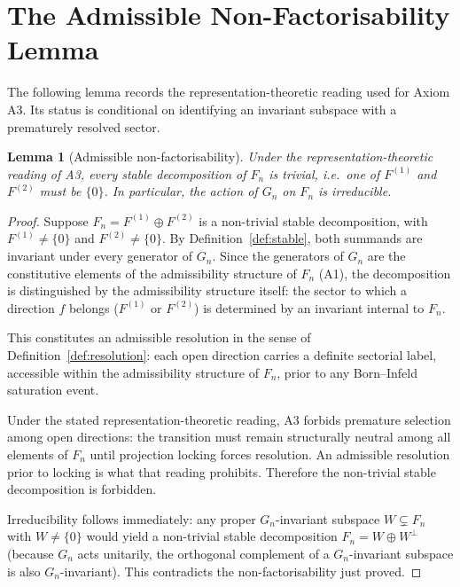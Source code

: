 \documentclass[11pt,a4paper]{article}
\newtheorem{lemma}[theorem]{Lemma}
\begin{document}
    \clearpage
  \section{The Admissible Non-Factorisability Lemma}
  \label{sec:lemma}

  The following lemma records the representation-theoretic reading used for
  Axiom A3.
  Its status is conditional on identifying an invariant subspace with a
  prematurely resolved sector.

  \begin{lemma}[Admissible non-factorisability]
    \label{lem:non-factorisation}
    Under the representation-theoretic reading of A3, every stable decomposition
    of $F_n$ is trivial, i.e.\ one of $F^{(1)}$ and $F^{(2)}$ must be $\{0\}$.
    In particular, the action of $G_n$ on $F_n$ is irreducible.
  \end{lemma}

  \begin{proof}
    Suppose $F_n = F^{(1)} \oplus F^{(2)}$ is a non-trivial stable decomposition,
    with $F^{(1)} \neq \{0\}$ and $F^{(2)} \neq \{0\}$.
    By Definition~\ref{def:stable}, both summands are invariant under every
    generator of $G_n$.
    Since the generators of $G_n$ are the constitutive elements of the
    admissibility structure of $F_n$ (A1), the decomposition is distinguished
    by the admissibility structure itself: the sector to which a direction $f$
    belongs ($F^{(1)}$ or $F^{(2)}$) is determined by an invariant internal to $F_n$.

    This constitutes an admissible resolution in the sense of
    Definition~\ref{def:resolution}: each open direction carries a definite
    sectorial label, accessible within the admissibility structure of $F_n$,
    prior to any Born--Infeld saturation event.

    Under the stated representation-theoretic reading, A3 forbids premature
    selection among open directions: the transition must remain structurally
    neutral among all elements of $F_n$ until projection locking forces
    resolution.
    An admissible resolution prior to locking is what that reading prohibits.
    Therefore the non-trivial stable decomposition is forbidden.

    Irreducibility follows immediately: any proper $G_n$-invariant subspace
    $W \subsetneq F_n$ with $W \neq \{0\}$ would yield a non-trivial stable
    decomposition $F_n = W \oplus W^\perp$ (because $G_n$ acts unitarily, the
    orthogonal complement of a $G_n$-invariant subspace is also $G_n$-invariant).
    This contradicts the non-factorisability just proved.
  \end{proof}
\end{document}
